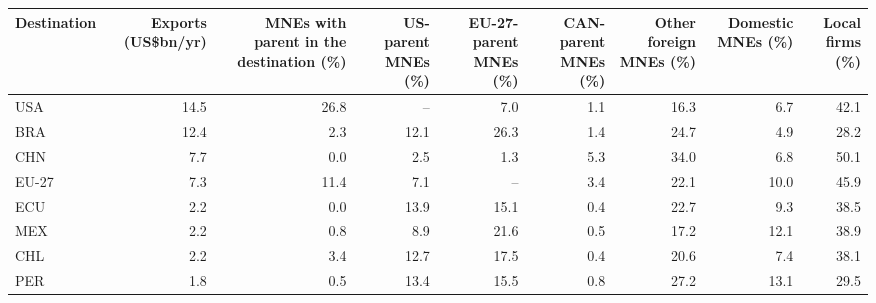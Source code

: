 \begin{tabular}{lrrrrrrrr}
\toprule
Destination & \multicolumn{1}{p{1.5cm}}{\raggedright Exports (US\$bn/yr)} & \multicolumn{1}{p{2.2cm}}{\raggedright MNEs with parent in the destination (\%)} & \multicolumn{1}{p{1.6cm}}{\raggedright US-parent MNEs (\%)} & \multicolumn{1}{p{1.6cm}}{\raggedright EU-27-parent MNEs (\%)} & \multicolumn{1}{p{1.6cm}}{\raggedright CAN-parent MNEs (\%)} & \multicolumn{1}{p{1.6cm}}{\raggedright Other foreign MNEs (\%)} & \multicolumn{1}{p{1.6cm}}{\raggedright Domestic MNEs (\%)} & \multicolumn{1}{p{1.5cm}}{\raggedright Local firms (\%)} \\
\midrule
USA & 14.5 & 26.8 & -- & 7.0 & 1.1 & 16.3 & 6.7 & 42.1 \\
BRA & 12.4 & 2.3 & 12.1 & 26.3 & 1.4 & 24.7 & 4.9 & 28.2 \\
CHN & 7.7 & 0.0 & 2.5 & 1.3 & 5.3 & 34.0 & 6.8 & 50.1 \\
EU-27 & 7.3 & 11.4 & 7.1 & -- & 3.4 & 22.1 & 10.0 & 45.9 \\
ECU & 2.2 & 0.0 & 13.9 & 15.1 & 0.4 & 22.7 & 9.3 & 38.5 \\
MEX & 2.2 & 0.8 & 8.9 & 21.6 & 0.5 & 17.2 & 12.1 & 38.9 \\
CHL & 2.2 & 3.4 & 12.7 & 17.5 & 0.4 & 20.6 & 7.4 & 38.1 \\
PER & 1.8 & 0.5 & 13.4 & 15.5 & 0.8 & 27.2 & 13.1 & 29.5 \\
\bottomrule
\end{tabular}
